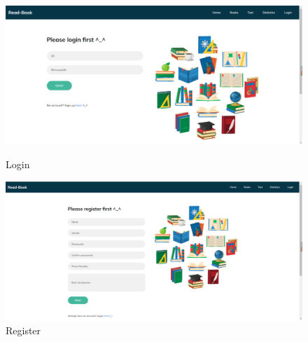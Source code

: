 \documentclass[twoside,11pt]{article}
\begin{document}
\begin{figure}[H]
    \begin{minipage}[t]{0.5\linewidth}
        \centering
        \includegraphics[width=0.9\columnwidth]{figures/login.png}
        \caption{Login}\label{fig:login}
    \end{minipage}
    \begin{minipage}[t]{0.5\linewidth}
        \centering
        \includegraphics[width=0.9\columnwidth]{figures/reg.png}
        \caption{Register}\label{fig:reg}
    \end{minipage}
\end{figure}
\end{document}
